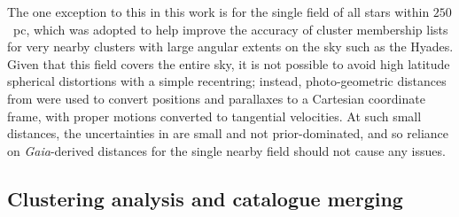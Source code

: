 The one exception to this in this work is for the single field of all stars within $250$~pc, which was adopted to help improve the accuracy of cluster membership lists for very nearby clusters with large angular extents on the sky such as the Hyades. Given that this field covers the entire sky, it is not possible to avoid high latitude spherical distortions with a simple recentring; instead, photo-geometric distances from \cite{bailer-jones_estimating_2021} were used to convert positions and parallaxes to a Cartesian coordinate frame, with proper motions converted to tangential velocities. At such small distances, the uncertainties in \cite{bailer-jones_estimating_2021} are small and not prior-dominated, and so reliance on \emph{Gaia}-derived distances for the single nearby field should not cause any issues.




\subsection{Clustering analysis and catalogue merging}

